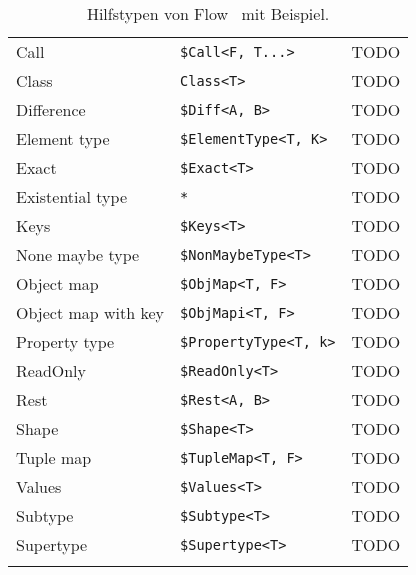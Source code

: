 \begin{longtabuwrap}
\begin{longtabu} to 
  \midrule
   &  &  \\
  \midrule
  \endhead
  \midrule
  \endfoot
  \endlastfoot
  Call                & \texttt{\$Call<F, T...>}        & TODO   \\
  Class               & \texttt{Class<T>}               & TODO   \\
  Difference          & \texttt{\$Diff<A, B>}           & TODO   \\
  Element type        & \texttt{\$ElementType<T, K>}    & TODO   \\
  Exact               & \texttt{\$Exact<T>}             & TODO   \\
  Existential type    & \texttt{*}                      & TODO   \\
  Keys                & \texttt{\$Keys<T>}              & TODO   \\
  None maybe type     & \texttt{\$NonMaybeType<T>}      & TODO   \\
  Object map          & \texttt{\$ObjMap<T, F>}         & TODO   \\
  Object map with key & \texttt{\$ObjMapi<T, F>}        & TODO   \\
  Property type       & \texttt{\$PropertyType<T, k>}   & TODO   \\
  ReadOnly            & \texttt{\$ReadOnly<T>}          & TODO   \\
  Rest                & \texttt{\$Rest<A, B>}           & TODO   \\
  Shape               & \texttt{\$Shape<T>}             & TODO   \\
  Tuple map           & \texttt{\$TupleMap<T, F>}       & TODO   \\
  Values              & \texttt{\$Values<T>}            & TODO   \\
  Subtype             & \texttt{\$Subtype<T>}           & TODO   \\
  Supertype           & \texttt{\$Supertype<T>}         & TODO   \\
  \midrule
  \caption{Hilfstypen von Flow~\autocite{FLOW:UTILITY_TYPES} mit Beispiel.}
  \label{tab:flow-utility-types}
\end{longtabu}
\end{longtabuwrap}
